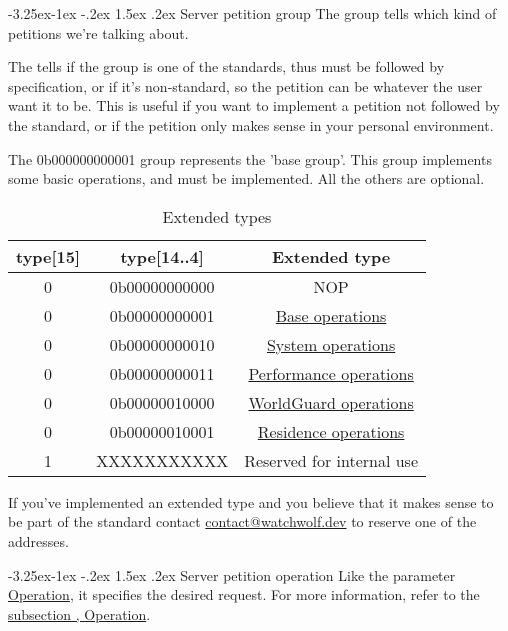 \documentclass[11pt]{article}
\makeatletter
\renewcommand\subsection{\@startsection{subsection}{2}{\z@}%
                                         {-3.25ex\@plus -1ex \@minus -.2ex}%
                                         {1.5ex \@plus .2ex}%
                                         {\normalfont\fontfamily{phv}\fontsize{14}{17}\bfseries}}
\makeatother
\begin{document}
\subsection{Server petition group} \label{s:server-group}
The group tells which kind of petitions we're talking about.

The  tells if the group is one of the standards, thus must be followed by specification, or if it's non-standard, so the petition can be whatever the user want it to be. This is useful if you want to implement a petition not followed by the standard, or if the petition only makes sense in your personal environment.

The 0b000000000001 group represents the 'base group'. This group implements some basic operations, and must be implemented. All the others are optional.

\begin{table}[H]
	\centering
	\begin{tabular}{ |c|c|c| }
		\hline
		type[15] & type[14..4] & Extended type \\
		\hline
		0 & 0b00000000000 & NOP\footnotemark \\
		0 & 0b00000000001 & \hyperref[g:base]{Base operations} \\
		0 & 0b00000000010 & \hyperref[g:system]{System operations} \\
		0 & 0b00000000011 & \hyperref[g:performance]{Performance operations} \\
		0 & 0b00000010000 & \hyperref[g:worldguard]{WorldGuard operations} \\
		0 & 0b00000010001 & \hyperref[g:residence]{Residence operations} \\
		\hline
		1 &   XXXXXXXXXXX & Reserved for internal use \\
		\hline
	\end{tabular}
	\caption{Extended types}
\end{table}


If you've implemented an extended type and you believe that it makes sense to be part of the standard contact \href{mailto:contact@watchwolf.dev?subject=WatchWolf - New extended type}{contact@watchwolf.dev} to reserve one of the addresses.

\subsection{Server petition operation} \label{s:server-operation}
Like the parameter \hyperref[s:operation]{Operation}, it specifies the desired request. For more information, refer to the \hyperref[s:operation]{subsection , Operation}.
\end{document}
